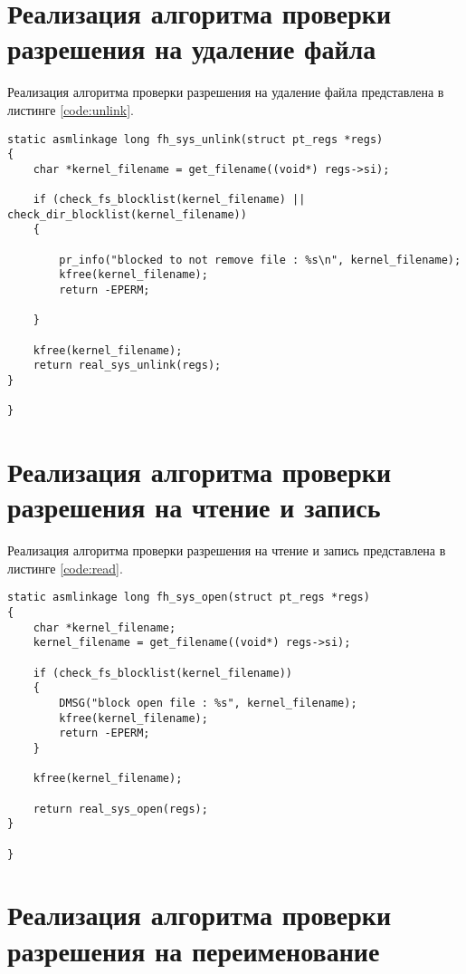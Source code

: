 \section{Реализация алгоритма проверки разрешения на удаление файла}

Реализация алгоритма проверки разрешения на удаление файла представлена в листинге \ref{code:unlink}.

\begin{lstlisting}[label=code:unlink,caption=Реализация алгоритма проверки разрешения на удаление файла]
static asmlinkage long fh_sys_unlink(struct pt_regs *regs)
{
    char *kernel_filename = get_filename((void*) regs->si);

    if (check_fs_blocklist(kernel_filename) || check_dir_blocklist(kernel_filename))
    {

        pr_info("blocked to not remove file : %s\n", kernel_filename);
        kfree(kernel_filename);
        return -EPERM;

    }

    kfree(kernel_filename);
    return real_sys_unlink(regs);
}

}
\end{lstlisting}

\section{Реализация алгоритма проверки разрешения на чтение и запись}

Реализация алгоритма проверки разрешения на чтение и запись представлена в листинге \ref{code:read}.

\begin{lstlisting}[label=code:read,caption=Реализация алгоритма проверки разрешения на чтение из файла]
static asmlinkage long fh_sys_open(struct pt_regs *regs)
{
	char *kernel_filename;
	kernel_filename = get_filename((void*) regs->si);

	if (check_fs_blocklist(kernel_filename))
	{
		DMSG("block open file : %s", kernel_filename);
		kfree(kernel_filename);
		return -EPERM;
	}

	kfree(kernel_filename);

	return real_sys_open(regs);
}

}
\end{lstlisting}

\section{Реализация алгоритма проверки разрешения на переименование}

